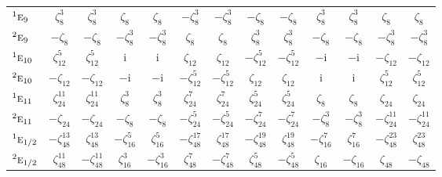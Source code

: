 \documentclass[10pt,a4paper]{article}
\makeatletter
\def\grouprule#1#2{\noalign{\marks\LTgroupmarks{\the\belowrulesep}\nobreak\vskip#1%
  \vskip\aboverulesep}\multispan\LT@cols\unskip{\leaders\hrule\@height#2\hfill\kern\z@}\cr
  \noalign{\penalty\LTrulebreak\vskip\belowrulesep\global\@lastruleclass\z@}}
\numberwithin{equation}{section}
\newcommand{\irr}[1]{\text{\normalfont\scshape #1}}
\newcommand{\conjpair}[1]{{}^{#1}}
\newcommand{\iunit}{\mathrm{i}}
\newcommand{\rootunity}[1]{\zeta_{#1}}
\makeatother
\begin{document}
{\begin{longtable}{@{}lcccccccccccc@{}}
$\conjpair{1}\irr{e}_{9}$ & $\rootunity{8}^{3}$ & $\rootunity{8}^{3}$ & $\rootunity{8}$ & $\rootunity{8}$ & $-\rootunity{8}^{3}$ & $-\rootunity{8}^{3}$ & $-\rootunity{8}$ & $-\rootunity{8}$ & $\rootunity{8}^{3}$ & $\rootunity{8}^{3}$ & $\rootunity{8}$ & $\rootunity{8}$\\
$\conjpair{2}\irr{e}_{9}$ & $-\rootunity{8}$ & $-\rootunity{8}$ & $-\rootunity{8}^{3}$ & $-\rootunity{8}^{3}$ & $\rootunity{8}$ & $\rootunity{8}$ & $\rootunity{8}^{3}$ & $\rootunity{8}^{3}$ & $-\rootunity{8}$ & $-\rootunity{8}$ & $-\rootunity{8}^{3}$ & $-\rootunity{8}^{3}$\\
$\conjpair{1}\irr{e}_{10}$ & $\rootunity{12}^{5}$ & $\rootunity{12}^{5}$ & $\iunit{}$ & $\iunit{}$ & $\rootunity{12}$ & $\rootunity{12}$ & $-\rootunity{12}^{5}$ & $-\rootunity{12}^{5}$ & $-\iunit{}$ & $-\iunit{}$ & $-\rootunity{12}$ & $-\rootunity{12}$\\
$\conjpair{2}\irr{e}_{10}$ & $-\rootunity{12}$ & $-\rootunity{12}$ & $-\iunit{}$ & $-\iunit{}$ & $-\rootunity{12}^{5}$ & $-\rootunity{12}^{5}$ & $\rootunity{12}$ & $\rootunity{12}$ & $\iunit{}$ & $\iunit{}$ & $\rootunity{12}^{5}$ & $\rootunity{12}^{5}$\\
$\conjpair{1}\irr{e}_{11}$ & $\rootunity{24}^{11}$ & $\rootunity{24}^{11}$ & $\rootunity{8}^{3}$ & $\rootunity{8}^{3}$ & $\rootunity{24}^{7}$ & $\rootunity{24}^{7}$ & $\rootunity{24}^{5}$ & $\rootunity{24}^{5}$ & $\rootunity{8}$ & $\rootunity{8}$ & $\rootunity{24}$ & $\rootunity{24}$\\
$\conjpair{2}\irr{e}_{11}$ & $-\rootunity{24}$ & $-\rootunity{24}$ & $-\rootunity{8}$ & $-\rootunity{8}$ & $-\rootunity{24}^{5}$ & $-\rootunity{24}^{5}$ & $-\rootunity{24}^{7}$ & $-\rootunity{24}^{7}$ & $-\rootunity{8}^{3}$ & $-\rootunity{8}^{3}$ & $-\rootunity{24}^{11}$ & $-\rootunity{24}^{11}$\\
\grouprule{0pt}{\lightrulewidth}
$\conjpair{1}\irr{e}_{1/2}$ & $-\rootunity{48}^{13}$ & $\rootunity{48}^{13}$ & $-\rootunity{16}^{5}$ & $\rootunity{16}^{5}$ & $-\rootunity{48}^{17}$ & $\rootunity{48}^{17}$ & $-\rootunity{48}^{19}$ & $\rootunity{48}^{19}$ & $-\rootunity{16}^{7}$ & $\rootunity{16}^{7}$ & $-\rootunity{48}^{23}$ & $\rootunity{48}^{23}$\\
$\conjpair{2}\irr{e}_{1/2}$ & $\rootunity{48}^{11}$ & $-\rootunity{48}^{11}$ & $\rootunity{16}^{3}$ & $-\rootunity{16}^{3}$ & $\rootunity{48}^{7}$ & $-\rootunity{48}^{7}$ & $\rootunity{48}^{5}$ & $-\rootunity{48}^{5}$ & $\rootunity{16}$ & $-\rootunity{16}$ & $\rootunity{48}$ & $-\rootunity{48}$\\

\end{longtable}}
\end{document}
